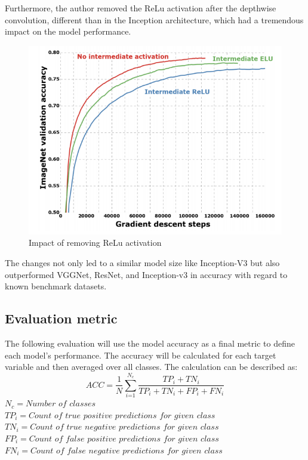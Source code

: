 Furthermore, the author removed the ReLu activation after the depthwise convolution, different than in the Inception architecture, which had a tremendous impact on the model performance.
\begin{figure}
  \centering
  \includegraphics[width=\linewidth]{figures/xception_activation.png}
  \caption{Impact of removing ReLu activation}
  \label{xception_activation}
\end{figure}

The changes not only led to a similar model size like Inception-V3 but also outperformed  VGGNet, ResNet, and Inception-v3 in accuracy with regard to known benchmark datasets\cite{chollet2017xception}.

\subsection{Evaluation metric}

The following evaluation will use the model accuracy as a final metric to define  each model's performance. The accuracy will be calculated for each target variable and then averaged over all classes. The calculation can be described as:
\begin{equation}
ACC=\frac{1}{N} \sum_\textit{i=1}^{N_\textit{c}} \displaystyle\frac{TP_{\textit{i}}+TN_{\textit{i}}}{TP_{\textit{i}}+TN_{\textit{i}}+FP_{\textit{i}}+FN_{\textit{i}}}
\end{equation}
\break
$N_\textit{c}=\textit{Number of classes}$\\
$TP_\textit{i} = \textit{Count of true positive predictions for given class}$\\
$TN_\textit{i} = \textit{Count of true negative predictions for given class}$\\
$FP_\textit{i} = \textit{Count of false positive predictions for given class}$\\
$FN_\textit{i} = \textit{Count of false negative predictions for given class}$





